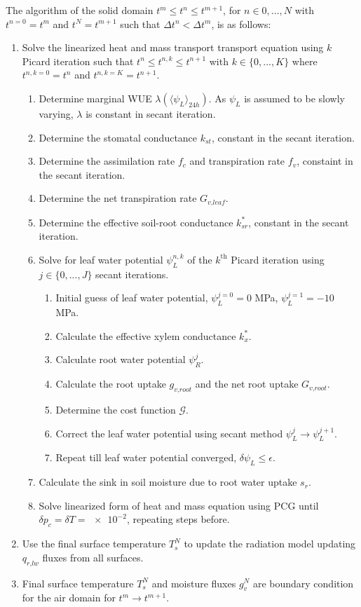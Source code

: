 The algorithm of the solid domain $t^{m} \le t^{n} \le t^{m+1}$, for $n\in {0,...,N}$
with $t^{n=0} = t^m$ and $t^{N} = t^{m+1}$ such that $\Delta t^n < \Delta t^m$, is as follows:

\begin{enumerate}
	\item Solve the linearized heat and mass transport transport equation using $k$ Picard iteration such that $t^n \le t^{n,k} \le t^{n+1}$ with $k \in \{0,...,K\}$ where $t^{n,k=0} = t^{n}$ and $t^{n,k=K}=t^{n+1}$.
		\begin{enumerate}[label=(\alph*)]
			\item Determine marginal WUE $\lambda\left(\langle\psi_L\rangle_{24h}\right)$. As $\psi_L$ is assumed to be slowly varying, $\lambda$ is constant in secant iteration.
			\item Determine the stomatal conductance $k_{\textit{st}}$, constant in the secant iteration.
			\item Determine the assimilation rate $f_c$ and transpiration rate $f_v$, constaint in the secant iteration.
			\item Determine the net transpiration rate $G_{\textit{v,leaf}}$.
			\item Determine the effective soil-root conductance $k_{sr}^*$, constant in the secant iteration.
			\item Solve for leaf water potential $\psi_L^{n,k}$ of the $k^{\mathrm{th}}$ Picard iteration using $j\in\{0,...,J\}$ secant iterations.
				\begin{enumerate}[label=(\alph*)]
					\item Initial guess of leaf water potential, $\psi_L^{j=0} = 0$ MPa, $\psi_L^{j=1} = -10$ MPa.
					\item Calculate the effective xylem conductance $k_x^*$.
					\item Calculate root water potential $\psi_R^j$.
					\item Calculate the root uptake $g_{\textit{v,root}}$ and the net root uptake $G_{\textit{v,root}}$.
					\item Determine the cost function $\mathcal{G}$.
					\item Correct the leaf water potential using secant method $\psi_L^{j}\rightarrow\psi_L^{j+1}$.
					\item Repeat till leaf water potential converged, $\delta \psi_L \le \epsilon$.
				\end{enumerate}
			\item Calculate the sink in soil moisture due to root water uptake $s_{r}$.
			\item Solve linearized form of heat and mass equation using PCG until $\delta p_c = \delta T = \num{e-2}$, repeating steps before.
		\end{enumerate}
	\item Use the final surface temperature $T_s^{N}$ to update the radiation model updating $q_{\textit{r,lw}}$ fluxes from all surfaces.
	\item Final surface temperature $T_s^N$ and moisture fluxes $g_{v}^N$ are boundary condition for the air domain for $t^{m}\rightarrow t^{m+1}$.
\end{enumerate}
